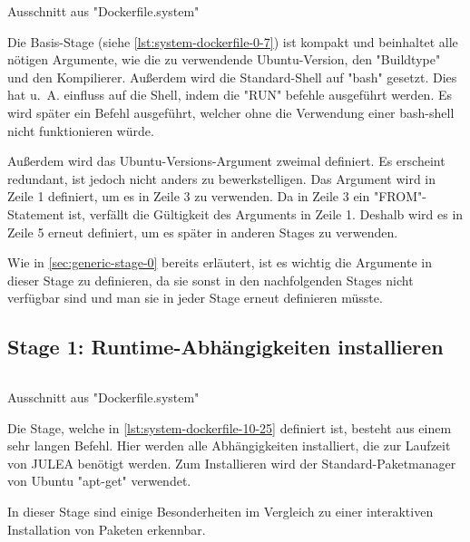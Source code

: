 \begin{listing}[H]
    \inputminted[firstline=0,lastline=7]{dockerfile}{./code-examples/Dockerfile.system}
    \caption{Ausschnitt aus "Dockerfile.system"}
    \label{lst:system-dockerfile-0-7}

\end{listing}
Die Basis-Stage (siehe \cref{lst:system-dockerfile-0-7}) ist kompakt und beinhaltet alle nötigen Argumente, wie die zu verwendende Ubuntu-Version, den "Buildtype" und den Kompilierer. Außerdem wird die Standard-Shell auf "bash" gesetzt. Dies hat u. A. einfluss auf die Shell, indem die "RUN" befehle ausgeführt werden. Es wird später ein Befehl ausgeführt, welcher ohne die Verwendung einer bash-shell nicht funktionieren würde.

Außerdem wird das Ubuntu-Versions-Argument zweimal definiert. Es erscheint redundant, ist jedoch nicht anders zu bewerkstelligen. Das Argument wird in Zeile 1 definiert, um es in Zeile 3 zu verwenden. Da in Zeile 3 ein "FROM"-Statement ist, verfällt die Gültigkeit des Arguments in Zeile 1. Deshalb wird es in Zeile 5 erneut definiert, um es später in anderen Stages zu verwenden. 

Wie in \cref{sec:generic-stage-0} bereits erläutert, ist es wichtig die Argumente in dieser Stage zu definieren, da sie sonst in den nachfolgenden Stages nicht verfügbar sind und man sie in jeder Stage erneut definieren müsste.

\subsection{Stage 1: Runtime-Abhängigkeiten installieren} \label{sec:system-stage-1}

\begin{listing}[H]
    \inputminted[firstline=10,lastline=25]{dockerfile}{./code-examples/Dockerfile.system}
    \caption{Ausschnitt aus "Dockerfile.system"}
    \label{lst:system-dockerfile-10-25}
\end{listing}

Die Stage, welche in \cref{lst:system-dockerfile-10-25} definiert ist, besteht aus einem sehr langen Befehl. Hier werden alle Abhängigkeiten installiert, die zur Laufzeit von JULEA benötigt werden. Zum Installieren wird der Standard-Paketmanager von Ubuntu "apt-get" verwendet.

In dieser Stage sind einige Besonderheiten im Vergleich zu einer interaktiven Installation von Paketen erkennbar.

